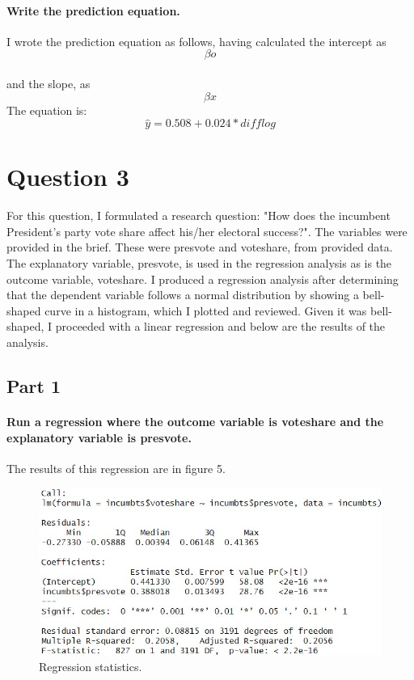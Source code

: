 \documentclass{article}
\begin{document}
\paragraph{Write the prediction equation.}
I wrote the prediction equation as follows, having calculated the intercept as 
\begin{equation}
	\beta o
\end{equation} 
\paragraph{}and the slope, as 
\begin{equation}
	\beta x
\end{equation}The equation is:
\begin{equation}
	\hat{y} = 0.508 + 0.024 * difflog
\end{equation}
\section{Question 3}

For this question, I formulated a research question: "How does the incumbent President's party vote share affect his/her electoral success?". The variables were provided in the brief. These were presvote and voteshare, from provided data. The explanatory variable, presvote, is used in the regression analysis as is the outcome variable, voteshare. I produced a regression analysis after determining that the dependent variable follows a normal distribution by showing a bell-shaped curve in a histogram, which I plotted and reviewed. Given it was bell-shaped, I proceeded with a linear regression and below are the results of the analysis.   
\subsection{Part 1}
\paragraph{Run a regression where the outcome variable is voteshare and the explanatory variable is presvote.}
The results of this regression are in figure 5.
\begin{figure}[H]
	\centering
	\includegraphics[width=0.9\linewidth]{Question3RegressionAnalysis.jpg}
	\caption{Regression statistics.}
	\label{fig:Regression statistics}
\end{figure}
\end{document}
